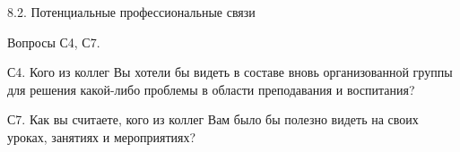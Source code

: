 \begin{frame}{8.2. Потенциальные профессиональные связи }

Вопросы С4, С7.

С4. Кого из коллег Вы хотели бы видеть в составе вновь организованной группы для решения какой-либо проблемы в области преподавания и воспитания?

С7. Как вы считаете, кого из коллег Вам было бы полезно видеть на своих уроках, занятиях и мероприятиях?

\end{frame}


